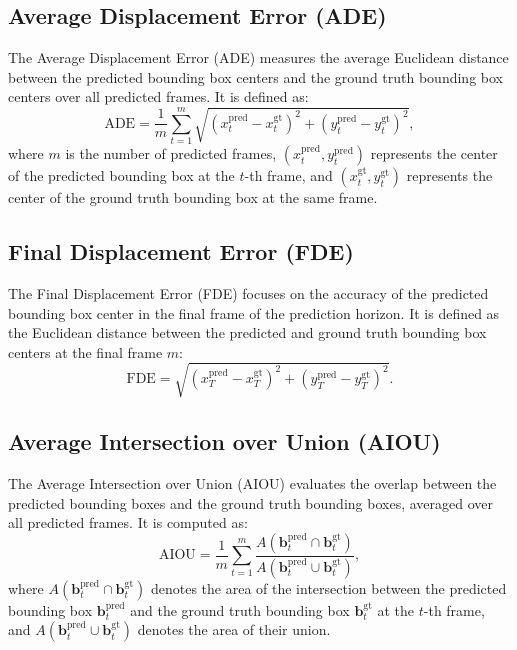 \documentclass[12pt,oneside]{book} %
\begin{document}
\subsection*{Average Displacement Error (ADE)}
The Average Displacement Error (ADE) measures the average Euclidean distance
between the predicted bounding box centers and the ground truth bounding box
centers over all predicted frames. It is defined as:
\begin{equation}
    \text{ADE} = \frac{1}{m} \sum_{t=1}^{m} \sqrt{(x_t^{\text{pred}} - x_t^{\text{gt}})^2 + (y_t^{\text{pred}} - y_t^{\text{gt}})^2},
\end{equation}
where \(m\) is the number of predicted frames, \((x_t^{\text{pred}}, y_t^{\text{pred}})\) represents the center of the predicted bounding box at the \(t\)-th frame, and \((x_t^{\text{gt}}, y_t^{\text{gt}})\) represents the center of the ground truth bounding box at the same frame.

\subsection*{Final Displacement Error (FDE)}
The Final Displacement Error (FDE) focuses on the accuracy of the predicted
bounding box center in the final frame of the prediction horizon. It is defined
as the Euclidean distance between the predicted and ground truth bounding box
centers at the final frame \(m\):
\begin{equation}
    \text{FDE} = \sqrt{(x_T^{\text{pred}} - x_T^{\text{gt}})^2 + (y_T^{\text{pred}} - y_T^{\text{gt}})^2}.
\end{equation}

\subsection*{Average Intersection over Union (AIOU)}
The Average Intersection over Union (AIOU) evaluates the overlap between the
predicted bounding boxes and the ground truth bounding boxes, averaged over all
predicted frames. It is computed as:
\begin{equation}
    \text{AIOU} = \frac{1}{m} \sum_{t=1}^{m} \frac{A(\mathbf{b}_t^{\text{pred}} \cap \mathbf{b}_t^{\text{gt}})}{A(\mathbf{b}_t^{\text{pred}} \cup \mathbf{b}_t^{\text{gt}})},
\end{equation}
where \(A(\mathbf{b}_t^{\text{pred}} \cap \mathbf{b}_t^{\text{gt}})\) denotes the area of the intersection between the predicted bounding box \(\mathbf{b}_t^{\text{pred}}\) and the ground truth bounding box \(\mathbf{b}_t^{\text{gt}}\) at the \(t\)-th frame, and \(A(\mathbf{b}_t^{\text{pred}} \cup \mathbf{b}_t^{\text{gt}})\) denotes the area of their union.
\end{document}
